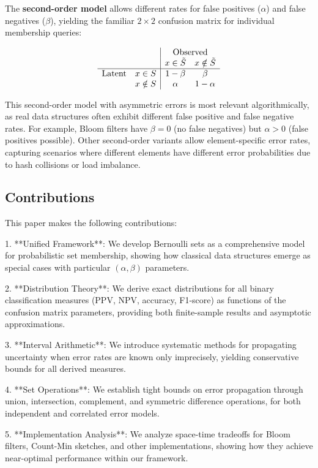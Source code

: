 \documentclass[11pt]{article}
\begin{document}
The \textbf{second-order model} allows different rates for false positives ($\alpha$) and false negatives ($\beta$), yielding the familiar $2 \times 2$ confusion matrix for individual membership queries:

\[
\begin{array}{cc|cc}
& & \multicolumn{2}{c}{\text{Observed}} \\
& & x \in \observed{S} & x \notin \observed{S} \\
\hline
\text{Latent} & x \in S & 1 - \beta & \beta \\
& x \notin S & \alpha & 1 - \alpha
\end{array}
\]

This second-order model with asymmetric errors is most relevant algorithmically, as real data structures often exhibit different false positive and false negative rates. For example, Bloom filters have $\beta = 0$ (no false negatives) but $\alpha > 0$ (false positives possible). Other second-order variants allow element-specific error rates, capturing scenarios where different elements have different error probabilities due to hash collisions or load imbalance.

\subsection{Contributions}

This paper makes the following contributions:

1. **Unified Framework**: We develop Bernoulli sets as a comprehensive model for probabilistic set membership, showing how classical data structures emerge as special cases with particular $(\alpha, \beta)$ parameters.

2. **Distribution Theory**: We derive exact distributions for all binary classification measures (PPV, NPV, accuracy, F1-score) as functions of the confusion matrix parameters, providing both finite-sample results and asymptotic approximations.

3. **Interval Arithmetic**: We introduce systematic methods for propagating uncertainty when error rates are known only imprecisely, yielding conservative bounds for all derived measures.

4. **Set Operations**: We establish tight bounds on error propagation through union, intersection, complement, and symmetric difference operations, for both independent and correlated error models.

5. **Implementation Analysis**: We analyze space-time tradeoffs for Bloom filters, Count-Min sketches, and other implementations, showing how they achieve near-optimal performance within our framework.
\end{document}
